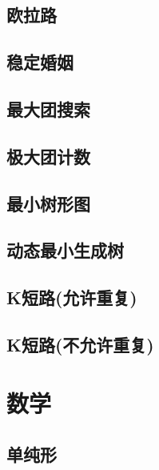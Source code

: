 \documentclass[10pt]{article}
\begin{document}
	\subsection{欧拉路}
		

	\subsection{稳定婚姻}
		

	\subsection{最大团搜索}
		
	
	\subsection{极大团计数}
		

	\subsection{最小树形图}
		

	\subsection{动态最小生成树}
		

	\subsection{K短路(允许重复)}
		

	\subsection{K短路(不允许重复)}
		

\section{数学}
	\subsection{单纯形}
		
\end{document}
